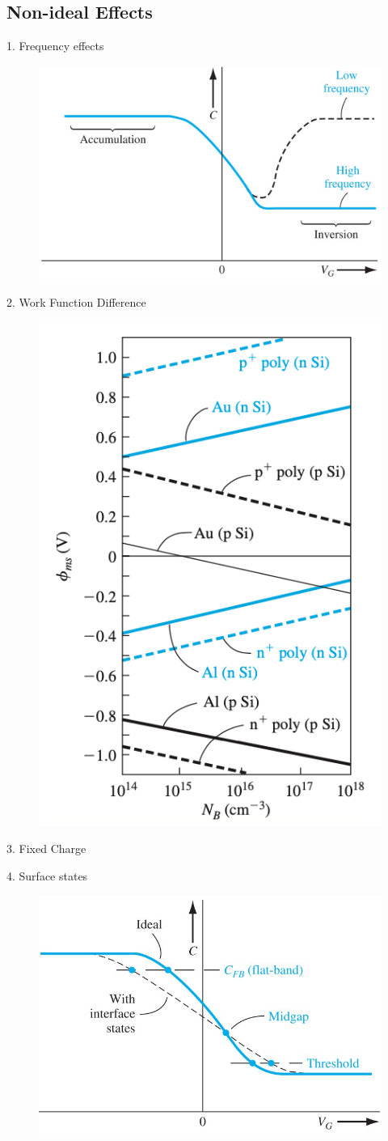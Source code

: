 \documentclass[a4paper, twocolumn]{article}
\begin{document}
    \subsection*{Non-ideal Effects}
    \par 1. Frequency effects
    \begin{figure}[H]
        \centering
        \includegraphics[width=0.6\linewidth]{Frequency-effect.jpg}
        \label{fig:Frequency-effect.jpg}
    \end{figure}
    \par 2. Work Function Difference
    \begin{figure}[H]
        \centering
        \includegraphics[width=0.6\linewidth]{Phi-ms.png}
    \end{figure}
    \par 3. Fixed Charge
    \par 4. Surface states
    \begin{figure}[H]
        \centering
        \includegraphics[width=0.6\linewidth]{Surface-states.jpg}
        \label{fig:Surface-states.jpg}
    \end{figure}
    
\end{document}
